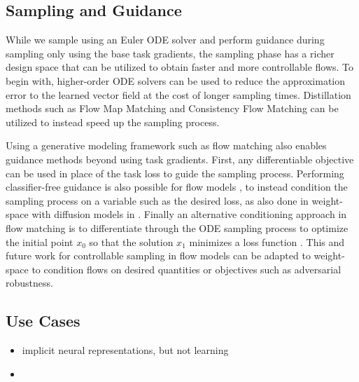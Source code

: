 \subsection{Sampling and Guidance}

While we sample using an Euler ODE solver and perform guidance during sampling only using the base task gradients, the sampling phase has a richer design space that can be utilized to obtain faster and more controllable flows. To begin with, higher-order ODE solvers can be used to reduce the approximation error to the learned vector field at the cost of longer sampling times. Distillation methods such as Flow Map Matching \citep{boffiFlowMapMatching2024} and Consistency Flow Matching \citep{yangConsistencyFlowMatching2024} can be utilized to instead speed up the sampling process.  

Using a generative modeling framework such as flow matching also enables guidance methods beyond using task gradients. First, any differentiable objective can be used in place of the task loss to guide the sampling process. Performing classifier-free guidance is also possible for flow models \citep{zhengGuidedFlowsGenerative2023}, to instead condition the sampling process on a variable such as the desired loss, as also done in weight-space with diffusion models in \citet{peeblesLearningLearnGenerative2022}. Finally an alternative conditioning approach in flow matching is to differentiate through the ODE sampling process to optimize the initial point $x_0$ so that the solution $x_1$ minimizes a loss function \citep{ben-hamuDFlowDifferentiatingFlows2024}. This and future work for controllable sampling in flow models can be adapted to weight-space to condition flows on desired quantities or objectives such as adversarial robustness. 

\subsection{Use Cases}
\begin{itemize}
    \item implicit neural representations, but not learning
    \item 
\end{itemize}